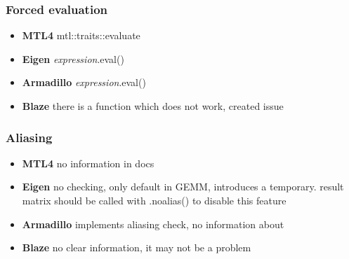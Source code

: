 \documentclass{article}
\begin{document}
\subsubsection{Forced evaluation}
\begin{itemize}
\item \textbf{MTL4} mtl::traits::evaluate \\
\item \textbf{Eigen} \textit{expression}.eval() \\
\item \textbf{Armadillo} \textit{expression}.eval() \\
\item \textbf{Blaze} there is a function which does not work, created issue \\
\end{itemize}

\subsubsection{Aliasing}
\begin{itemize}
\item \textbf{MTL4} no information in docs \\
\item \textbf{Eigen} no checking, only default in GEMM, introduces a temporary. result matrix should be called with .noalias() to disable this feature\\ 
\item \textbf{Armadillo} implements aliasing check, no information about  \\
\item \textbf{Blaze} no clear information, it may not be a problem \\
\end{itemize}
\end{document}

